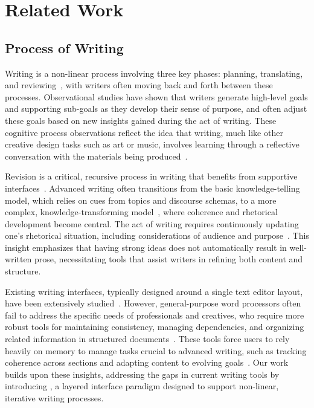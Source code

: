 \section{Related Work}

\subsection{Process of Writing}
Writing is a non-linear process involving three key phases: planning, translating, and reviewing~\cite{hayes1980identifying}, with writers often moving back and forth between these processes. Observational studies have shown that writers generate high-level goals and supporting sub-goals as they develop their sense of purpose, and often adjust these goals based on new insights gained during the act of writing. These cognitive process observations reflect the idea that writing, much like other creative design tasks such as art or music, involves learning through a reflective conversation with the materials being produced~\cite{bamberger1983learning}.

Revision is a critical, recursive process in writing that benefits from supportive interfaces~\cite{fitzgerald1987research, seow2002writing}. Advanced writing often transitions from the basic knowledge-telling model, which relies on cues from topics and discourse schemas, to a more complex, knowledge-transforming model~\cite{bereiter1987psychology}, where coherence and rhetorical development become central. The act of writing requires continuously updating one's rhetorical situation, including considerations of audience and purpose~\cite{flower1980cognition}. This insight emphasizes that having strong ideas does not automatically result in well-written prose, necessitating tools that assist writers in refining both content and structure.

Existing writing interfaces, typically designed around a single text editor layout, have been extensively studied~\cite{whiteside1982people, egan1982learner}. However, general-purpose word processors often fail to address the specific needs of professionals and creatives, who require more robust tools for maintaining consistency, managing dependencies, and organizing related information in structured documents~\cite{han2020designing}. These tools force users to rely heavily on memory to manage tasks crucial to advanced writing, such as tracking coherence across sections and adapting content to evolving goals~\cite{han2020textlets, han2020designing}. Our work builds upon these insights, addressing the gaps in current writing tools by introducing \system, a layered interface paradigm designed to support non-linear, iterative writing processes. 



